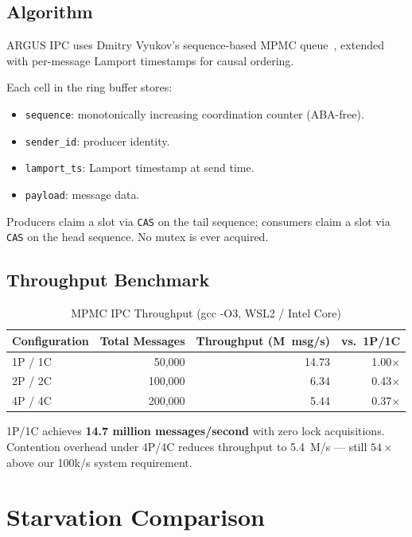 \documentclass[sigconf]{acmart}
\begin{document}
\subsection{Algorithm}

ARGUS IPC uses Dmitry Vyukov's sequence-based MPMC queue~\cite{vyukov2010mpmc},
extended with per-message Lamport timestamps for causal ordering.

Each cell in the ring buffer stores:
\begin{itemize}
  \item \texttt{sequence}: monotonically increasing coordination counter (ABA-free).
  \item \texttt{sender\_id}: producer identity.
  \item \texttt{lamport\_ts}: Lamport timestamp at send time.
  \item \texttt{payload}: message data.
\end{itemize}

Producers claim a slot via \texttt{CAS} on the tail sequence; consumers
claim a slot via \texttt{CAS} on the head sequence.  No mutex is ever
acquired.

\subsection{Throughput Benchmark}

\begin{table}[h]
\centering
\caption{MPMC IPC Throughput (gcc -O3, WSL2 / Intel Core)}
\label{tab:ipc}
\begin{tabular}{@{}lrrr@{}}
\toprule
Configuration & Total Messages & Throughput (M~msg/s) & vs.\ 1P/1C \\
\midrule
1P / 1C & 50{,}000 & 14.73 & 1.00$\times$ \\
2P / 2C & 100{,}000 & 6.34 & 0.43$\times$ \\
4P / 4C & 200{,}000 & 5.44 & 0.37$\times$ \\
\bottomrule
\end{tabular}
\end{table}

1P/1C achieves \textbf{14.7 million messages/second} with zero lock
acquisitions.  Contention overhead under 4P/4C reduces throughput to
5.4~M/s — still $54\times$ above our 100k/s system requirement.

\section{Starvation Comparison}
\label{sec:starvation}
\end{document}
